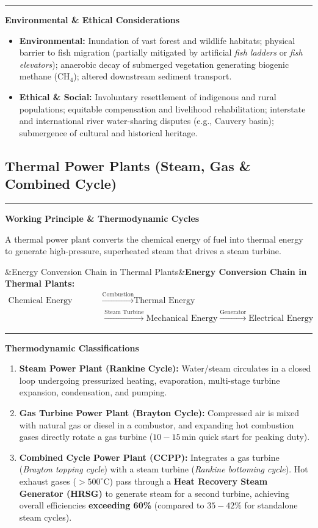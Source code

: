 \documentclass[11pt,a4paper]{article}
\newcommand{\concept}[1]{%
  \vspace{3pt}\noindent\textcolor{AnthGreen}{\rule{3.5pt}{10pt}}\enspace
  \textbf{\sffamily\color{AnthDark}#1}\par\vspace{2pt}%
}
\newenvironment{Def}[1][]{\begin{tcolorbox}[defbox]\ifx&#1&\else\textbf{\color{AnthOrange}#1:}\enspace\fi}{\end{tcolorbox}}
\begin{document}
\concept{Environmental \& Ethical Considerations}
\begin{itemize}
  \item \textbf{Environmental:} Inundation of vast forest and wildlife habitats; physical barrier to fish migration (partially mitigated by artificial \emph{fish ladders} or \emph{fish elevators}); anaerobic decay of submerged vegetation generating biogenic methane ($\text{CH}_4$); altered downstream sediment transport.
  \item \textbf{Ethical \& Social:} Involuntary resettlement of indigenous and rural populations; equitable compensation and livelihood rehabilitation; interstate and international river water-sharing disputes (e.g., Cauvery basin); submergence of cultural and historical heritage.
\end{itemize}

\subsection{Thermal Power Plants (Steam, Gas \& Combined Cycle)}

\concept{Working Principle \& Thermodynamic Cycles}
A thermal power plant converts the chemical energy of fuel into thermal energy to generate high-pressure, superheated steam that drives a steam turbine.

\begin{Def}[Energy Conversion Chain in Thermal Plants]
\begin{align*}
  \text{Chemical Energy (Fuel)} &\xrightarrow{\text{Combustion}} \text{Thermal Energy} \\
  &\xrightarrow{\text{Steam Turbine}} \text{Mechanical Energy} \xrightarrow{\text{Generator}} \text{Electrical Energy}
\end{align*}
\end{Def}

\concept{Thermodynamic Classifications}
\begin{enumerate}
  \item \textbf{Steam Power Plant (Rankine Cycle):} Water/steam circulates in a closed loop undergoing pressurized heating, evaporation, multi-stage turbine expansion, condensation, and pumping.
  \item \textbf{Gas Turbine Power Plant (Brayton Cycle):} Compressed air is mixed with natural gas or diesel in a combustor, and expanding hot combustion gases directly rotate a gas turbine ($10-15\,\text{min}$ quick start for peaking duty).
  \item \textbf{Combined Cycle Power Plant (CCPP):} Integrates a gas turbine (\emph{Brayton topping cycle}) with a steam turbine (\emph{Rankine bottoming cycle}). Hot exhaust gases ($>500^\circ\text{C}$) pass through a \textbf{Heat Recovery Steam Generator (HRSG)} to generate steam for a second turbine, achieving overall efficiencies \textbf{exceeding 60\%} (compared to $35-42\%$ for standalone steam cycles).
\end{enumerate}
\end{document}
